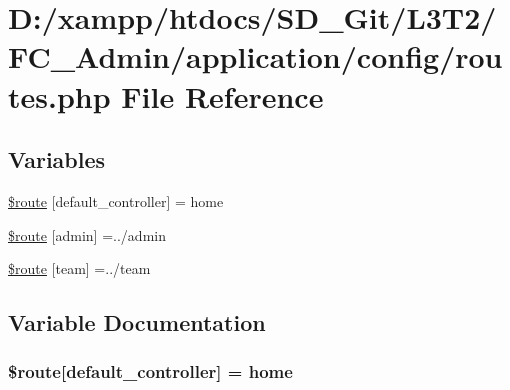\hypertarget{_admin_2application_2config_2routes_8php}{}\section{D\+:/xampp/htdocs/\+S\+D\+\_\+\+Git/\+L3\+T2/\+F\+C\+\_\+\+Admin/application/config/routes.php File Reference}
\label{_admin_2application_2config_2routes_8php}
\subsection*{Variables}
\begin{DoxyCompactItemize}
\item 
\hyperlink{_admin_2application_2config_2routes_8php_a6c2a82e4cec825eb1921141d08af834b}{\$route} \mbox{[}\textquotesingle{}default\+\_\+controller\textquotesingle{}\mbox{]} = \textquotesingle{}home\textquotesingle{}
\item 
\hyperlink{_admin_2application_2config_2routes_8php_a740e1be77b5d698dffaec236d905a70f}{\$route} \mbox{[}\textquotesingle{}admin\textquotesingle{}\mbox{]} =\textquotesingle{}../admin\textquotesingle{}
\item 
\hyperlink{_admin_2application_2config_2routes_8php_a24c71ec5d89877e8866d4fb7d4dbc4ed}{\$route} \mbox{[}\textquotesingle{}team\textquotesingle{}\mbox{]} =\textquotesingle{}../team\textquotesingle{}
\end{DoxyCompactItemize}


\subsection{Variable Documentation}
\hypertarget{_admin_2application_2config_2routes_8php_a6c2a82e4cec825eb1921141d08af834b}{}
\subsubsection[{\$route}]{\setlength{\rightskip}{0pt plus 5cm}\$route\mbox{[}\textquotesingle{}default\+\_\+controller\textquotesingle{}\mbox{]} = \textquotesingle{}home\textquotesingle{}}\label{_admin_2application_2config_2routes_8php_a6c2a82e4cec825eb1921141d08af834b}
\hypertarget{_admin_2application_2config_2routes_8php_a740e1be77b5d698dffaec236d905a70f}{}
